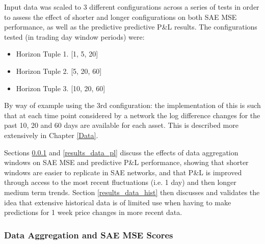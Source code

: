 \documentclass[a4paper,11pt,oneside]{article}
\theoremstyle{plain}
\theoremstyle{definition}
\begin{document}
	Input data was scaled to 3 different configurations across a series of tests in order to assess the effect of shorter and longer configurations on both SAE MSE performance, as well as the predictive predictive P\&L results. The configurations tested (in trading day window periods) were:
	
	\begin{itemize}
		\item[] Horizon Tuple 1. [1, 5, 20]
		\item[] Horizon Tuple 2. [5, 20, 60]
		\item[] Horizon Tuple 3. [10, 20, 60]
	\end{itemize}
	
	By way of example using the 3rd configuration: the implementation of this is such that at each time point considered by a network the log difference changes for the past 10, 20 and 60 days are available for each asset. This is described more extensively in Chapter \ref{Data}.\newline
	
	Sections \ref{results_data_mse} and \ref{results_data_pl} discuss the effects of data aggregation windows on SAE MSE and predictive P\&L performance, showing that shorter windows are easier to replicate in SAE networks, and that P\&L is improved through access to the most recent fluctuations (i.e. 1 day) and then longer medium term trends. Section \ref{results_data_hist} then discusses and validates the idea that extensive historical data is of limited use when having to make predictions for 1 week price changes in more recent data.
	
	\subsubsection{Data Aggregation and SAE MSE Scores}\label{results_data_mse}
	
\end{document}
